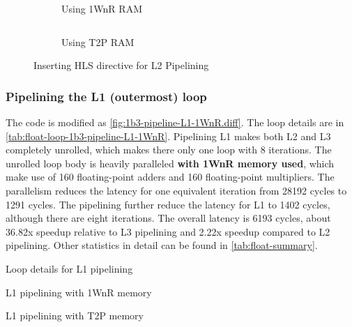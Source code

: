 \begin{figure}[ht!]

    \begin{subfigure}{\textwidth}
        \centering
        \inputminted[firstline=3]{diff}{program/1b2-pipeline-L2-1WnR.diff}
        \caption{Using 1WnR RAM}
        \label{fig:1b2-pipeline-L2-1WnR.diff}
    \end{subfigure}

    \begin{subfigure}{\textwidth}
        \centering
        \inputminted[firstline=3]{diff}{program/1b2-pipeline-L2-T2P.diff}
        \caption{Using T2P RAM}
        \label{fig:1b2-pipeline-L2-T2P.diff}
    \end{subfigure}

    \caption{Inserting HLS directive for L2 Pipelining}

\end{figure}

\subsubsection{Pipelining the L1 (outermost) loop}\label{sec:1bL1}

The code is modified as \autoref{fig:1b3-pipeline-L1-1WnR.diff}.
The loop details are in \autoref{tab:float-loop-1b3-pipeline-L1-1WnR}.
Pipelining L1 makes both L2 and L3 completely unrolled, which makes there only one loop with 8 iterations.
The unrolled loop body is heavily paralleled \textbf{with 1WnR memory used}, which make use of 160 floating-point adders and 160 floating-point multipliers.
The parallelism reduces the latency for one equivalent iteration from 28192 cycles to 1291 cycles.
The pipelining further reduce the latency for L1 to 1402 cycles, although there are eight iterations.
The overall latency is 6193 cycles, about 36.82x speedup relative to L3 pipelining and 2.22x speedup compared to L2 pipelining.
Other statistics in detail can be found in \autoref{tab:float-summary}.

\begin{table}[ht!]
    \caption{Loop details for L1 pipelining}

    \centering

    \begin{subtable}{\textwidth}
        \caption{L1 pipelining with 1WnR memory}
        \label{tab:float-loop-1b3-pipeline-L1-1WnR}
        
    \end{subtable}

    \begin{subtable}{\textwidth}
        \caption{L1 pipelining with T2P memory}
        \label{tab:float-loop-1b3-pipeline-L1-T2P}
        
    \end{subtable}

\end{table}

